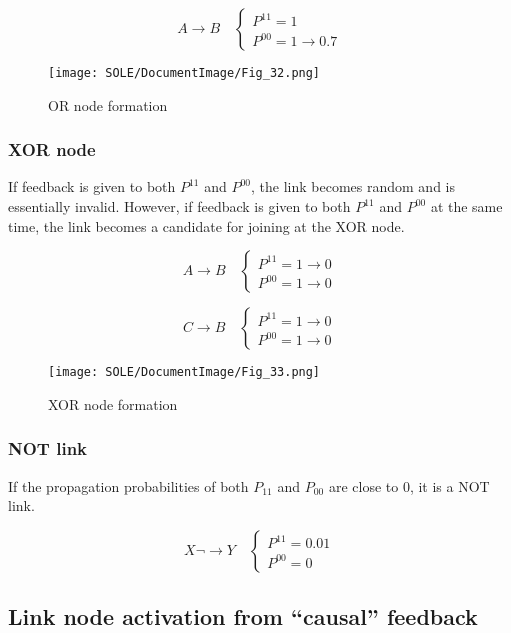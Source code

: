 \documentclass[12pt]{article}
\begin{document}
\[A \rightarrow B \quad
\begin{cases}
P^{11}=1 \\
P^{00}=1 \rightarrow 0.7
\end{cases}
\]

\begin{figure}[ht]
  \centering
  \texttt{[image: SOLE/DocumentImage/Fig\_32.png]}
  \caption{OR node formation}
  \label{fig:or_node_formation}
\end{figure}

\subsubsection{XOR node}\label{xor-node}

If feedback is given to both \(P^{11}\) and \(P^{00}\), the link becomes
random and is essentially invalid. However, if feedback is given to both
\(P^{11}\) and \(P^{00}\) at the same time, the link becomes a candidate
for joining at the XOR node.

\[A \rightarrow B \quad
\begin{cases}
P^{11}=1 \rightarrow 0 \\
P^{00}=1 \rightarrow 0
\end{cases}
\]

\[C \rightarrow B \quad
\begin{cases}
P^{11}=1 \rightarrow 0 \\
P^{00}=1 \rightarrow 0
\end{cases}
\]

\begin{figure}[ht]
  \centering
  \texttt{[image: SOLE/DocumentImage/Fig\_33.png]}
  \caption{XOR node formation}
  \label{fig:xor_node_formation}
\end{figure}

\subsubsection{NOT link}\label{not-link}

If the propagation probabilities of both \(P_{11}\) and \(P_{00}\) are
close to 0, it is a NOT link.

\[X \neg\rightarrow Y \quad
\begin{cases}
P^{11}=0.01 \\
P^{00}=0
\end{cases}
\]

\subsection{Link node activation from ``causal''
feedback}\label{link-node-activation-from-causal-feedback}
\end{document}
